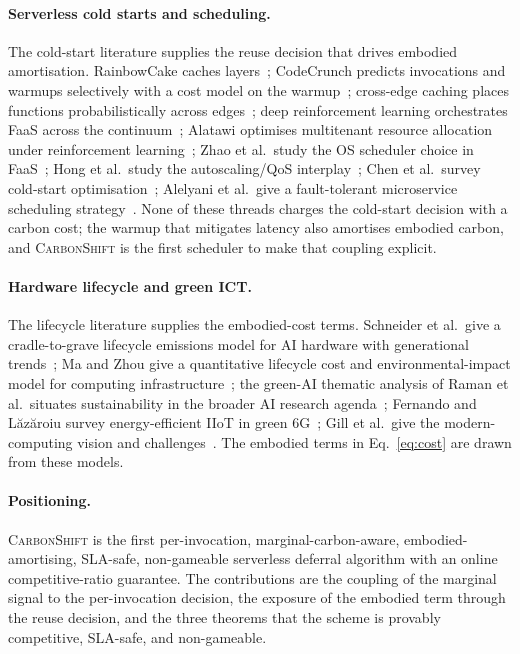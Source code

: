 \paragraph{Serverless cold starts and scheduling.}
The cold-start literature supplies the reuse decision that drives embodied amortisation. RainbowCake caches layers~\cite{yu2024rainbowcake}; CodeCrunch predicts invocations and warmups selectively with a cost model on the warmup~\cite{roy2024codecrunch}; cross-edge caching places functions probabilistically across edges~\cite{chen2024crossedge}; deep reinforcement learning orchestrates FaaS across the continuum~\cite{khansari2024deep}; Alatawi optimises multitenant resource allocation under reinforcement learning~\cite{alatawi2025optimizing}; Zhao et al.\ study the OS scheduler choice in FaaS~\cite{zhao2024serverless}; Hong et al.\ study the autoscaling/QoS interplay~\cite{hong2024analysis}; Chen et al.\ survey cold-start optimisation~\cite{chen2026cold}; Alelyani et al.\ give a fault-tolerant microservice scheduling strategy~\cite{alelyani2024optimizing}. None of these threads charges the cold-start decision with a carbon cost; the warmup that mitigates latency also amortises embodied carbon, and \textsc{CarbonShift} is the first scheduler to make that coupling explicit.

\paragraph{Hardware lifecycle and green ICT.}
The lifecycle literature supplies the embodied-cost terms. Schneider et al.\ give a cradle-to-grave lifecycle emissions model for AI hardware with generational trends~\cite{schneider2025lifecycle}; Ma and Zhou give a quantitative lifecycle cost and environmental-impact model for computing infrastructure~\cite{ma2024comprehensive}; the green-AI thematic analysis of Raman et al.\ situates sustainability in the broader AI research agenda~\cite{raman2024green}; Fernando and L\u{a}z\u{a}roiu survey energy-efficient IIoT in green 6G~\cite{raman2024energy}; Gill et al.\ give the modern-computing vision and challenges~\cite{gill2024modern}. The embodied terms in Eq.~\eqref{eq:cost} are drawn from these models.

\paragraph{Positioning.}
\textsc{CarbonShift} is the first per-invocation, marginal-carbon-aware, embodied-amortising, SLA-safe, non-gameable serverless deferral algorithm with an online competitive-ratio guarantee. The contributions are the coupling of the marginal signal to the per-invocation decision, the exposure of the embodied term through the reuse decision, and the three theorems that the scheme is provably competitive, SLA-safe, and non-gameable.
